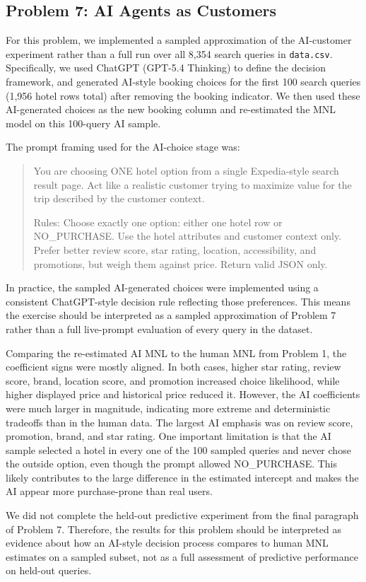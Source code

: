 
\subsection*{Problem 7: AI Agents as Customers}

For this problem, we implemented a sampled approximation of the AI-customer experiment rather than a full run over all 8{,}354 search queries in \texttt{data.csv}. Specifically, we used ChatGPT (GPT-5.4 Thinking) to define the decision framework, and generated AI-style booking choices for the first 100 search queries (1{,}956 hotel rows total) after removing the booking indicator. We then used these AI-generated choices as the new booking column and re-estimated the MNL model on this 100-query AI sample.

The prompt framing used for the AI-choice stage was:

\begin{quote}
You are choosing ONE hotel option from a single Expedia-style search result page. Act like a realistic customer trying to maximize value for the trip described by the customer context.

Rules:
Choose exactly one option: either one hotel row or NO\_PURCHASE.
Use the hotel attributes and customer context only.
Prefer better review score, star rating, location, accessibility, and promotions, but weigh them against price.
Return valid JSON only.
\end{quote}

In practice, the sampled AI-generated choices were implemented using a consistent ChatGPT-style decision rule reflecting those preferences. This means the exercise should be interpreted as a sampled approximation of Problem 7 rather than a full live-prompt evaluation of every query in the dataset.

Comparing the re-estimated AI MNL to the human MNL from Problem 1, the coefficient signs were mostly aligned. In both cases, higher star rating, review score, brand, location score, and promotion increased choice likelihood, while higher displayed price and historical price reduced it. However, the AI coefficients were much larger in magnitude, indicating more extreme and deterministic tradeoffs than in the human data. The largest AI emphasis was on review score, promotion, brand, and star rating. One important limitation is that the AI sample selected a hotel in every one of the 100 sampled queries and never chose the outside option, even though the prompt allowed NO\_PURCHASE. This likely contributes to the large difference in the estimated intercept and makes the AI appear more purchase-prone than real users.

We did not complete the held-out predictive experiment from the final paragraph of Problem 7. Therefore, the results for this problem should be interpreted as evidence about how an AI-style decision process compares to human MNL estimates on a sampled subset, not as a full assessment of predictive performance on held-out queries.
